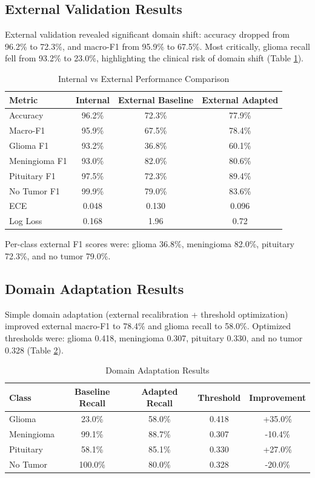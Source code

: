 \documentclass[11pt]{article}
\begin{document}
\subsection{External Validation Results}

External validation revealed significant domain shift: accuracy dropped from 96.2\% to 72.3\%, and macro-F1 from 95.9\% to 67.5\%. Most critically, glioma recall fell from 93.2\% to 23.0\%, highlighting the clinical risk of domain shift (Table \ref{tab:performance}).

\begin{table}[H]
\centering
\caption{Internal vs External Performance Comparison}
\label{tab:performance}
\begin{tabular}{@{}lccc@{}}
\toprule
\textbf{Metric} & \textbf{Internal} & \textbf{External Baseline} & \textbf{External Adapted} \\
\midrule
Accuracy & 96.2\% & 72.3\% & 77.9\% \\
Macro-F1 & 95.9\% & 67.5\% & 78.4\% \\
Glioma F1 & 93.2\% & 36.8\% & 60.1\% \\
Meningioma F1 & 93.0\% & 82.0\% & 80.6\% \\
Pituitary F1 & 97.5\% & 72.3\% & 89.4\% \\
No Tumor F1 & 99.9\% & 79.0\% & 83.6\% \\
ECE & 0.048 & 0.130 & 0.096 \\
Log Loss & 0.168 & 1.96 & 0.72 \\
\bottomrule
\end{tabular}
\end{table}

Per-class external F1 scores were: glioma 36.8\%, meningioma 82.0\%, pituitary 72.3\%, and no tumor 79.0\%.

\subsection{Domain Adaptation Results}

Simple domain adaptation (external recalibration + threshold optimization) improved external macro-F1 to 78.4\% and glioma recall to 58.0\%. Optimized thresholds were: glioma 0.418, meningioma 0.307, pituitary 0.330, and no tumor 0.328 (Table \ref{tab:adaptation}).

\begin{table}[H]
\centering
\caption{Domain Adaptation Results}
\label{tab:adaptation}
\begin{tabular}{@{}lcccc@{}}
\toprule
\textbf{Class} & \textbf{Baseline Recall} & \textbf{Adapted Recall} & \textbf{Threshold} & \textbf{Improvement} \\
\midrule
Glioma & 23.0\% & 58.0\% & 0.418 & +35.0\% \\
Meningioma & 99.1\% & 88.7\% & 0.307 & -10.4\% \\
Pituitary & 58.1\% & 85.1\% & 0.330 & +27.0\% \\
No Tumor & 100.0\% & 80.0\% & 0.328 & -20.0\% \\
\bottomrule
\end{tabular}
\end{table}
\end{document}
